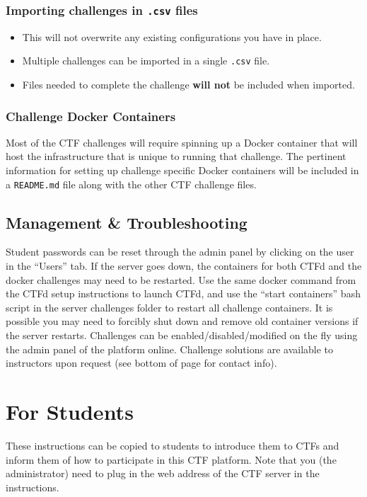 \documentclass[11pt]{article}
\begin{document}
\subsubsection{Importing challenges in \texttt{.csv} files}

\begin{itemize}
   \item This will not overwrite any existing configurations you have in place.
   \item Multiple challenges can be imported in a single \texttt{.csv} file.
   \item Files needed to complete the challenge \textbf{will not} be included when imported.
\end{itemize}

\subsubsection{Challenge Docker Containers}

Most of the CTF challenges will require spinning up a Docker container that will host the infrastructure that is unique to running that challenge.
The pertinent information for setting up challenge specific Docker containers will be included in a \texttt{README.md} file along with the other CTF challenge files.

\subsection{Management \& Troubleshooting}

Student passwords can be reset through the admin panel by clicking on the user in the ``Users'' tab.
If the server goes down, the containers for both CTFd and the docker challenges may need to be restarted. Use the same docker command from the CTFd setup instructions to launch CTFd, and use the ``start containers'' bash script in the server challenges folder to restart all challenge containers.
It is possible you may need to forcibly shut down and remove old container versions if the server restarts.
Challenges can be enabled/disabled/modified on the fly using the admin panel of the platform online.
Challenge solutions are available to instructors upon request (see bottom of page for contact info).

\section{For Students}

These instructions can be copied to students to introduce them to CTFs and inform them of how to participate in this CTF platform.
Note that you (the administrator) need to plug in the web address of the CTF server in the instructions.
\end{document}
